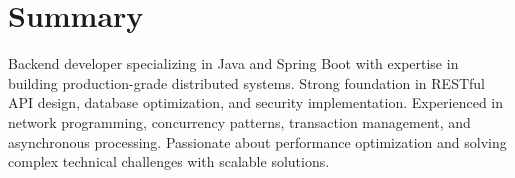 \section{Summary}
\noindent Backend developer specializing in Java and Spring Boot with expertise in building production-grade distributed systems. Strong foundation in RESTful API design, database optimization, and security implementation. Experienced in network programming, concurrency patterns, transaction management, and asynchronous processing. Passionate about performance optimization and solving complex technical challenges with scalable solutions.
